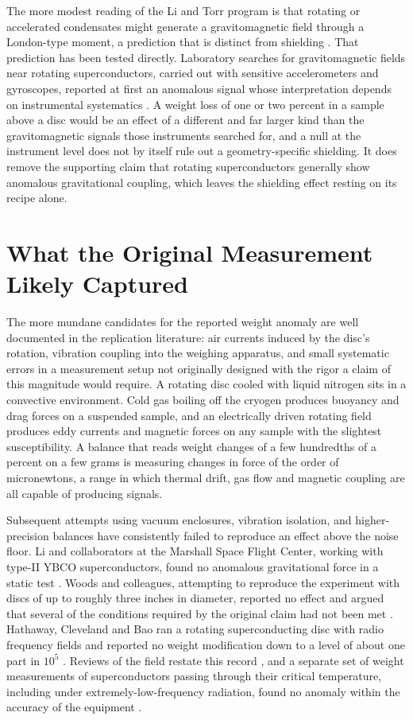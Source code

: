 \documentclass[11pt]{article}
\begin{document}
The more modest reading of the Li and Torr program is that rotating or accelerated condensates might generate a gravitomagnetic field through a London-type moment, a prediction that is distinct from shielding \cite{LT1991}. That prediction has been tested directly. Laboratory searches for gravitomagnetic fields near rotating superconductors, carried out with sensitive accelerometers and gyroscopes, reported at first an anomalous signal whose interpretation depends on instrumental systematics \cite{T2006}. A weight loss of one or two percent in a sample above a disc would be an effect of a different and far larger kind than the gravitomagnetic signals those instruments searched for, and a null at the instrument level does not by itself rule out a geometry-specific shielding. It does remove the supporting claim that rotating superconductors generally show anomalous gravitational coupling, which leaves the shielding effect resting on its recipe alone.

\section{What the Original Measurement Likely Captured}

The more mundane candidates for the reported weight anomaly are well documented in the replication literature: air currents induced by the disc's rotation, vibration coupling into the weighing apparatus, and small systematic errors in a measurement setup not originally designed with the rigor a claim of this magnitude would require. A rotating disc cooled with liquid nitrogen sits in a convective environment. Cold gas boiling off the cryogen produces buoyancy and drag forces on a suspended sample, and an electrically driven rotating field produces eddy currents and magnetic forces on any sample with the slightest susceptibility. A balance that reads weight changes of a few hundredths of a percent on a few grams is measuring changes in force of the order of micronewtons, a range in which thermal drift, gas flow and magnetic coupling are all capable of producing signals.

Subsequent attempts using vacuum enclosures, vibration isolation, and higher-precision balances have consistently failed to reproduce an effect above the noise floor. Li and collaborators at the Marshall Space Flight Center, working with type-II YBCO superconductors, found no anomalous gravitational force in a static test \cite{Li1997}. Woods and colleagues, attempting to reproduce the experiment with discs of up to roughly three inches in diameter, reported no effect and argued that several of the conditions required by the original claim had not been met \cite{W2001}. Hathaway, Cleveland and Bao ran a rotating superconducting disc with radio frequency fields and reported no weight modification down to a level of about one part in $10^5$ \cite{H2003}. Reviews of the field restate this record \cite{GMU2022}, and a separate set of weight measurements of superconductors passing through their critical temperature, including under extremely-low-frequency radiation, found no anomaly within the accuracy of the equipment \cite{T2004}.
\end{document}
